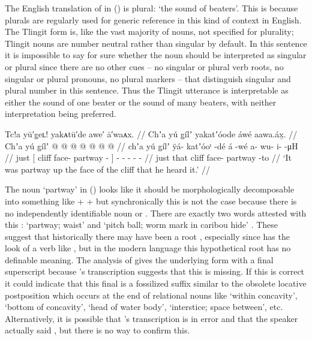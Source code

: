 The English translation of  in (\lastx) is plural: ‘the sound of beaters’.
This is because plurals are regularly used for generic reference in this kind of context in English.
The Tlingit form is, like the vast majority of nouns, not specified for plurality; Tlingit nouns are number neutral rather than singular by default.
In this sentence it is impossible to say for sure whether the noun should be interpreted as singular or plural since there are no other cues – no singular or plural verb roots, no singular or plural pronouns, no plural markers – that distinguish singular and plural number in this sentence.
Thus the Tlingit utterance is interpretable as either the sound of one beater or the sound of many beaters, with neither interpretation being preferred.

\ex\label{ex:91-55-heard-it-partway-up-cliff}%
%
\begingl
	\glpreamble	Tc!a yū′g̣eʟ! yakᴀtū′de awe′ ā′waᴀx. //
	\glpreamble	Chʼa yú g̱ílʼ yakatʼóode áwé aawa.áx̱. //
	\gla	Chʼa {} yú g̱ílʼ  @ {} @ {} {}  @ {}
		 @ {} @ {} @ {} @ {} //
	\glb	chʼa {} yú g̱ílʼ ÿá- katʼóoᵗ -dé {} á -wé
		a- wu- i-  -μH //
	\glc	just {}[  cliff face- partway - {}]  -
		- - -  - //
	\gld	just {} that cliff face- partway -to {}  {}
		 {} {} {} {} //
	\glft	‘It was partway up the face of the cliff that he heard it.’
		//
\endgl
\xe

The noun  ‘partway’ in (\lastx) looks like it should be morphologically decomposable into something like  +  +  but synchronically this is not the case because there is no independently identifiable noun  or .
There are exactly two words attested with this :  ‘partway; waist’ and  ‘pitch ball; worm mark in caribou hide’ \parencites[07/151–152]{leer:1973}.
These suggest that historically there may have been a root , especially since  has the look of a verb like , but in the modern language this hypothetical root has no definable meaning.
The analysis of  gives the underlying form  with a final superscript  because \citeauthor{swanton:1909}’s transcription  suggests that this  is missing.
If this is correct it could indicate that this final  is a fossilized  suffix similar to the obsolete locative postposition  which occurs at the end of relational nouns like  ‘within concavity’,  ‘bottom of concavity’,  ‘head of water body’,  ‘interstice; space between’, etc.
Alternatively, it is possible that \citeauthor{swanton:1909}’s transcription is in error and that the speaker actually said , but there is no way to confirm this.

